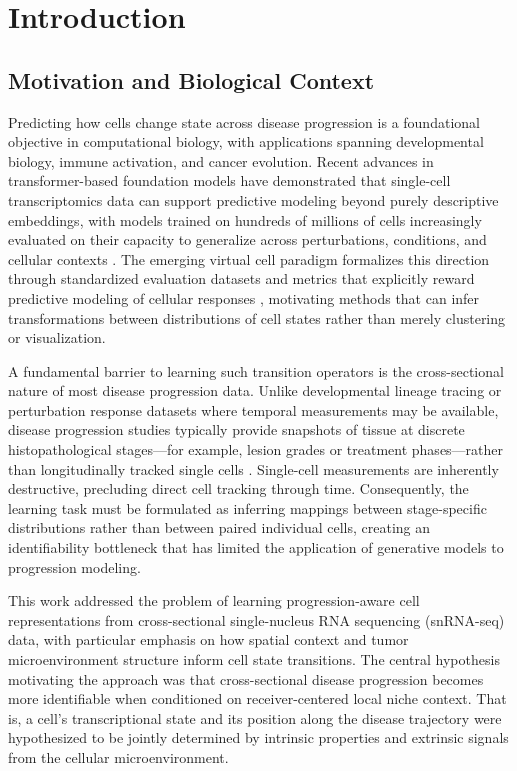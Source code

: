 \section{Introduction}

\subsection{Motivation and Biological Context}

Predicting how cells change state across disease progression is a foundational objective in computational biology, with applications spanning developmental biology, immune activation, and cancer evolution. Recent advances in transformer-based foundation models have demonstrated that single-cell transcriptomics data can support predictive modeling beyond purely descriptive embeddings, with models trained on hundreds of millions of cells increasingly evaluated on their capacity to generalize across perturbations, conditions, and cellular contexts \cite{Szalata2024-jl,Dong2026-fb,Adduri2025-nt}. The emerging virtual cell paradigm formalizes this direction through standardized evaluation datasets and metrics that explicitly reward predictive modeling of cellular responses \cite{Roohani2025-yb}, motivating methods that can infer transformations between distributions of cell states rather than merely clustering or visualization.

A fundamental barrier to learning such transition operators is the cross-sectional nature of most disease progression data. Unlike developmental lineage tracing or perturbation response datasets where temporal measurements may be available, disease progression studies typically provide snapshots of tissue at discrete histopathological stages---for example, lesion grades or treatment phases---rather than longitudinally tracked single cells \cite{Peng2025-xu}. Single-cell measurements are inherently destructive, precluding direct cell tracking through time. Consequently, the learning task must be formulated as inferring mappings between stage-specific distributions rather than between paired individual cells, creating an identifiability bottleneck that has limited the application of generative models to progression modeling.

This work addressed the problem of learning progression-aware cell representations from cross-sectional single-nucleus RNA sequencing (snRNA-seq) data, with particular emphasis on how spatial context and tumor microenvironment structure inform cell state transitions. The central hypothesis motivating the approach was that cross-sectional disease progression becomes more identifiable when conditioned on receiver-centered local niche context. That is, a cell's transcriptional state and its position along the disease trajectory were hypothesized to be jointly determined by intrinsic properties and extrinsic signals from the cellular microenvironment.


